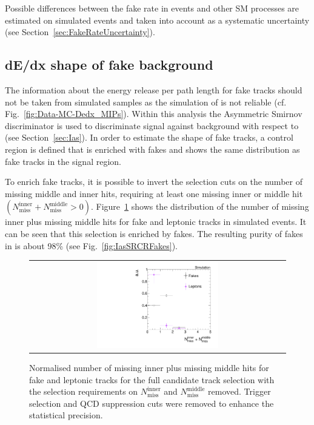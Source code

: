 Possible differences between the fake rate in \Zlep events and other SM processes are estimated on simulated events and taken into account as a systematic uncertainty (see Section~\ref{sec:FakeRateUncertainty}).

\subsection{dE/dx shape of fake background}
The information about the energy release per path length for fake tracks should not be taken from simulated samples as the simulation of \dedx is not reliable (cf. Fig.~\ref{fig:Data-MC-Dedx_MIPs}).
Within this analysis the Asymmetric Smirnov discriminator \ias is used to discriminate signal against background with respect to \dedx (see Section~\ref{sec:Ias}). 
In order to estimate the \ias shape of fake tracks, a control region \fakeCR is defined that is enriched with fakes and shows the same \ias distribution as fake tracks in the signal region.

To enrich fake tracks, it is possible to invert the selection cuts on the number of missing middle and inner hits, \ie requiring at least one missing inner or middle hit $\left( N_{\text{miss}}^{\text{inner}} +N_{\text{miss}}^{\text{middle}}>0\right)$.
Figure~\ref{fig:NMissInnerAndMiddle} shows the distribution of the number of missing inner plus missing middle hits for fake and leptonic tracks in simulated \WJets events.
It can be seen that this selection is enriched by fakes.
The resulting purity of fakes in \fakeCR is about 98\% (see Fig.~\ref{fig:IasSRCRFakes}). 
\begin{figure}[!b]
  \centering 
  \begin{tabular}{c}
    \includegraphics[width=0.49\textwidth]{figures/analysis_2/Background/NLostInnerPlusMiddleForAllBkg_chiTracksQCDsupressionTrigger.pdf}
  \end{tabular}
  \caption{Normalised number of missing inner plus missing middle hits for fake and leptonic tracks for the full candidate track selection with the selection requirements on $N_{\text{miss}}^{\text{inner}}$ and $N_{\text{miss}}^{\text{middle}}$ removed. Trigger selection and QCD suppression cuts were removed to enhance the statistical precision.}
  \label{fig:NMissInnerAndMiddle}
\end{figure}

